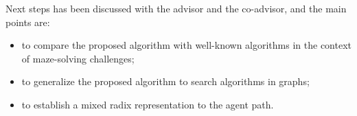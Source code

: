 Next steps has been discussed with the advisor and the co-advisor, and the main points are:

\begin{itemize}
\item to compare the proposed algorithm with well-known algorithms in the context of maze-solving challenges;
\item to generalize the proposed algorithm to search algorithms in graphs;
\item to establish a mixed radix representation to the agent path.
\end{itemize}